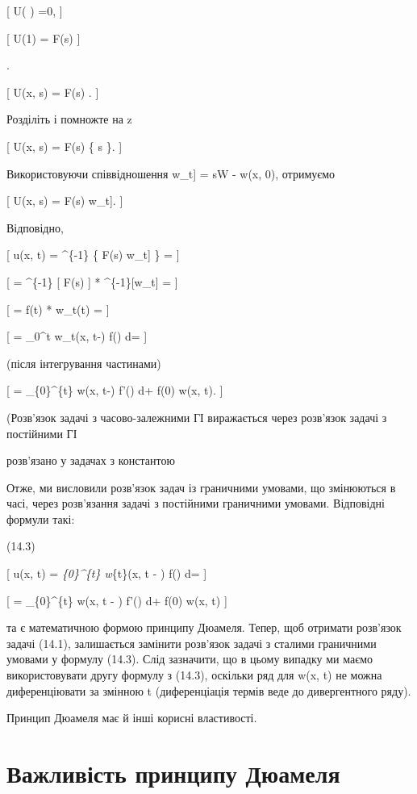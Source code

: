\documentclass[
  ukrainian,
]{article}
\begin{document}
{[} U\left( \right) =0, {]}

{[} U(1) = F(s) {]}

.

{[} U(x, s) = F(s)
. {]}

Розділіть і помножте на z

{[} U(x, s) = F(s) \left\{ s
 \right\}. {]}

Використовуючи співвідношення \mathscr{L}{[}w\_t{]} = sW - w(x, 0),
отримуємо

{[} U(x, s) = F(s) \mathcal{L}{[}w\_t{]}. {]}

Відповідно,

{[} u(x, t) = \^{}\{-1\} \{ F(s) \mathcal{L}{[}w\_t{]} \} =
{]}

{[} = \^{}\{-1\} {[} F(s) {]} *
\^{}\{-1\}{[}w\_t{]} = {]}

{[} = f(t) * w\_t(t) = {]}

{[} = \int\_0\^{}t w\_t(x, t-\tau) f(\tau) d\tau = {]}

(після інтегрування частинами)

{[} = \int\_\{0\}\^{}\{t\} w(x, t-\tau) f'(\tau) d\tau + f(0) w(x, t).
{]}

(Розв'язок задачі з часово-залежними ГІ виражається через розв'язок
задачі з постійними ГІ

розв'язано у задачах з константою

Отже, ми висловили розв'язок задач із граничними умовами, що змінюються
в часі, через розв'язання задачі з постійними граничними умовами.
Відповідні формули такі:

(14.3)

{[} u(x, t) = \int\emph{\{0\}\^{}\{t\} w}\{t\}(x, t - \tau) f(\tau)
d\tau = {]}

{[} = \int\_\{0\}\^{}\{t\} w(x, t - \tau) f'(\tau) d\tau + f(0) w(x, t)
{]}

та є математичною формою принципу Дюамеля. Тепер, щоб отримати розв'язок
задачі (14.1), залишається замінити розв'язок задачі з сталими
граничними умовами у формулу (14.3). Слід зазначити, що в цьому випадку
ми маємо використовувати другу формулу з (14.3), оскільки ряд для w(x,
t) не можна диференціювати за змінною t (диференціація термів веде до
дивергентного ряду).

Принцип Дюамеля має й інші корисні властивості.

\section{Важливість принципу
Дюамеля}\label{ux432ux430ux436ux43bux438ux432ux456ux441ux442ux44c-ux43fux440ux438ux43dux446ux438ux43fux443-ux434ux44eux430ux43cux435ux43bux44f}
\end{document}
